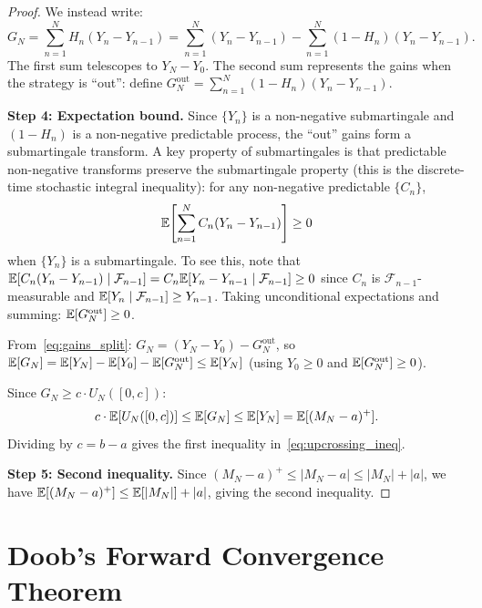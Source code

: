 \documentclass[11pt,a4paper]{article}
\begin{document}
\begin{proof}
We instead write:
\begin{equation}
  G_N = \sum_{n=1}^N H_n (Y_n - Y_{n-1})
  = \sum_{n=1}^N (Y_n - Y_{n-1})
    - \sum_{n=1}^N (1 - H_n)(Y_n - Y_{n-1}).
  \label{eq:gains_split}
\end{equation}
The first sum telescopes to $Y_N - Y_0$.  The second sum
represents the gains when the strategy is ``out'': define
$G_N^{\text{out}} = \sum_{n=1}^N (1 - H_n)(Y_n - Y_{n-1})$.

\textbf{Step 4: Expectation bound.}
Since $\{Y_n\}$ is a non-negative submartingale and $(1 - H_n)$
is a non-negative predictable process, the ``out'' gains form a
submartingale transform.  A key property of submartingales is
that predictable non-negative transforms preserve the
submartingale property (this is the discrete-time stochastic
integral inequality): for any non-negative predictable $\{C_n\}$,
\begin{equation}
  \mathbb{E}\!\left[\sum_{n=1}^N C_n (Y_n - Y_{n-1})\right] \geq 0
  \label{eq:sub_transform}
\end{equation}
when $\{Y_n\}$ is a submartingale.  To see this, note that
$\mathbb{E}[C_n(Y_n - Y_{n-1}) \mid \mathcal{F}_{n-1}]
= C_n \mathbb{E}[Y_n - Y_{n-1} \mid \mathcal{F}_{n-1}] \geq 0$
since $C_n$ is $\mathcal{F}_{n-1}$-measurable and
$\mathbb{E}[Y_n \mid \mathcal{F}_{n-1}] \geq Y_{n-1}$.  Taking
unconditional expectations and summing:
$\mathbb{E}[G_N^{\text{out}}] \geq 0$.

From~\eqref{eq:gains_split}: $G_N = (Y_N - Y_0) -
G_N^{\text{out}}$, so
$\mathbb{E}[G_N] = \mathbb{E}[Y_N] - \mathbb{E}[Y_0] - \mathbb{E}[G_N^{\text{out}}]
\leq \mathbb{E}[Y_N]$
(using $Y_0 \geq 0$ and $\mathbb{E}[G_N^{\text{out}}] \geq 0$).

Since $G_N \geq c \cdot U_N([0,c])$:
\begin{equation}
  c \cdot \mathbb{E}[U_N([0,c])] \leq \mathbb{E}[G_N] \leq \mathbb{E}[Y_N]
  = \mathbb{E}[(M_N - a)^+].
  \label{eq:upcrossing_final}
\end{equation}
Dividing by $c = b - a$
gives the first inequality
in~\eqref{eq:upcrossing_ineq}.

\textbf{Step 5: Second inequality.}
Since $(M_N - a)^+ \leq |M_N - a| \leq |M_N| + |a|$, we have
$\mathbb{E}[(M_N - a)^+] \leq \mathbb{E}[|M_N|] + |a|$, giving the second
inequality.
\end{proof}


\section{Doob's Forward Convergence Theorem}
\label{sec:doob_convergence}
\end{document}
